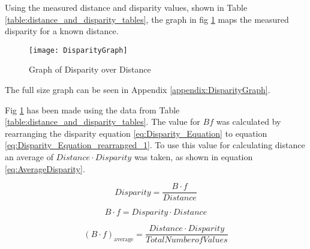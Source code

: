 \documentclass[conference]{IEEEtran}
\begin{document}
Using the measured distance and disparity values, shown in Table \ref{table:distance_and_disparity_tables}, the graph in fig \ref{fig:DisparityGraph} maps the measured disparity for a known distance.

\begin{figure}[H]
\centerline{\texttt{[image: DisparityGraph]}}
\caption{Graph of Disparity over Distance }
\label{fig:DisparityGraph}
\end{figure} 

The full size graph can be seen in Appendix \ref{appendix:DisparityGraph}.

Fig \ref{fig:DisparityGraph} has been made using the data from Table \ref{table:distance_and_disparity_tables}. The value for $Bf$ was calculated by rearranging the disparity equation \ref{eq:Disparity_Equation} to equation \ref{eq:Disparity_Equation_rearranged_1}. To use this value for calculating distance an average of $Distance \cdot Disparity$ was taken, as shown in equation \ref{eq:AverageDisparity}. 

\begin{equation} \label{eq:Disparity_Equation}
Disparity = \frac{B \cdot f}{Distance}
\end{equation}

\begin{equation} \label{eq:Disparity_Equation_rearranged_1}
B \cdot f = Disparity \cdot Distance
\end{equation}

\begin{equation} \label{eq:AverageDisparity}
(B \cdot f)_\textrm{average} = \frac{Distance \cdot Disparity}{Total Number of Values}
\end{equation}
\end{document}
